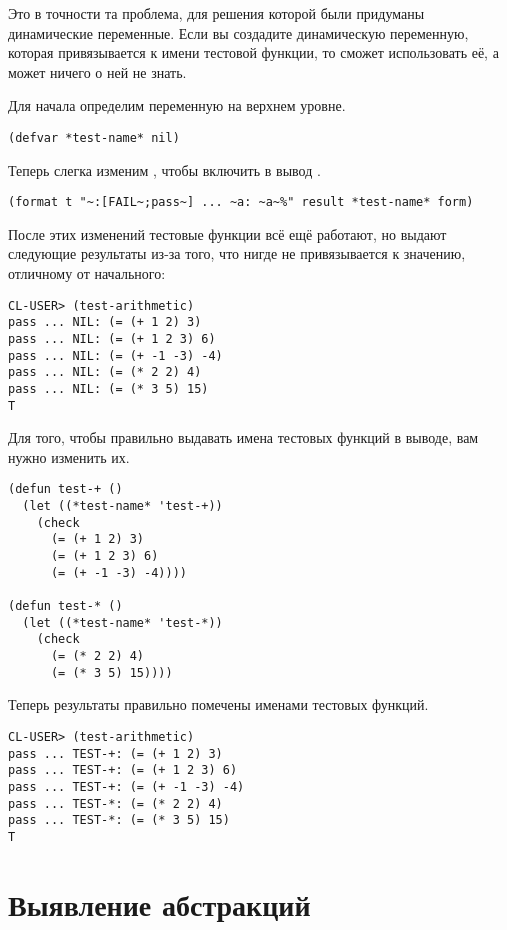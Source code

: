 Это в точности та проблема, для решения которой были придуманы динамические
переменные. Если вы создадите динамическую переменную, которая привязывается к имени
тестовой функции, то  сможет использовать её, а  может
ничего о ней не знать.

Для начала определим переменную на верхнем уровне.

\begin{lstlisting}
(defvar *test-name* nil)
\end{lstlisting}

Теперь слегка изменим , чтобы включить  в вывод
.

\begin{lstlisting}
(format t "~:[FAIL~;pass~] ... ~a: ~a~%" result *test-name* form)
\end{lstlisting}

После этих изменений тестовые функции всё ещё работают, но выдают следующие результаты
из-за того, что  нигде не привязывается к значению, отличному от
начального:

\begin{lstlisting}
CL-USER> (test-arithmetic)
pass ... NIL: (= (+ 1 2) 3)
pass ... NIL: (= (+ 1 2 3) 6)
pass ... NIL: (= (+ -1 -3) -4)
pass ... NIL: (= (* 2 2) 4)
pass ... NIL: (= (* 3 5) 15)
T
\end{lstlisting}

Для того, чтобы правильно выдавать имена тестовых функций в выводе, вам нужно изменить их.

\begin{lstlisting}
(defun test-+ ()
  (let ((*test-name* 'test-+))
    (check
      (= (+ 1 2) 3)
      (= (+ 1 2 3) 6)
      (= (+ -1 -3) -4))))

(defun test-* ()
  (let ((*test-name* 'test-*))
    (check
      (= (* 2 2) 4)
      (= (* 3 5) 15))))
\end{lstlisting}

Теперь результаты правильно помечены именами тестовых функций.

\begin{lstlisting}
CL-USER> (test-arithmetic)
pass ... TEST-+: (= (+ 1 2) 3)
pass ... TEST-+: (= (+ 1 2 3) 6)
pass ... TEST-+: (= (+ -1 -3) -4)
pass ... TEST-*: (= (* 2 2) 4)
pass ... TEST-*: (= (* 3 5) 15)
T
\end{lstlisting}

\section{Выявление абстракций}


